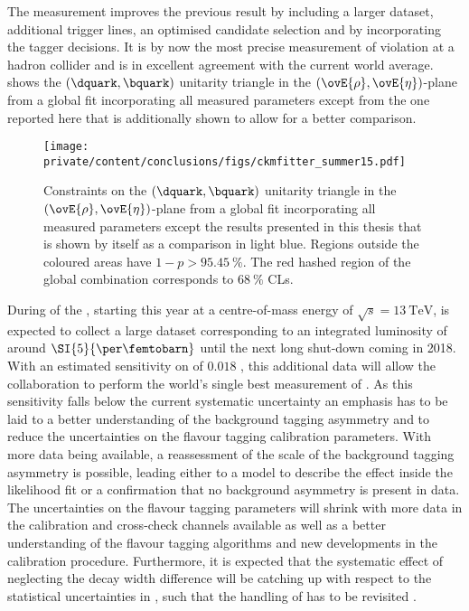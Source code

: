 The measurement improves the previous \LHCb result \cite{Aaij:1497268} by
including a larger dataset, additional trigger lines, an optimised candidate
selection and by incorporating the \SSpi tagger decisions. It is by now the most
precise measurement of \CP violation at a hadron collider and is in excellent
agreement with the current world average. 
shows the ${(\dquark,\bquark)}$ unitarity triangle in the
${(\ovE{\rho},\ovE{\eta})}$-plane from a global fit incorporating all measured
\CKM parameters \cite{Charles:2004jd} except from the one reported here that is
additionally shown to allow for a better comparison.
%
\begin{figure}[ht]
\centering
\texttt{[image: private/content/conclusions/figs/ckmfitter\_summer15.pdf]}
\caption{Constraints on the ${(\dquark,\bquark)}$ unitarity triangle in the
${(\ovE{\rho},\ovE{\eta})}$-plane from a global fit incorporating all measured
\CKM parameters except the results presented in this thesis that is shown by
itself as a comparison in light blue. Regions outside the coloured areas have
$1-p > \SI{95.45}{\percent}$. The red hashed region of the global combination
corresponds to $\SI{68}{\percent}$ \acp{CL}. \cite{Charles:2004jd}}
\label{fig:conclusion:ckm_fitter_15}
\end{figure}

During \RunTwo of the \LHC, starting this year at a centre-of-mass energy of
$\sqrt{s} = \SI{13}{\TeV}$, \LHCb is expected to collect a large dataset
corresponding to an integrated luminosity of around $\SI{5}{\per\femtobarn}$
until the next long shut-down coming in 2018. With an estimated sensitivity on
\SJpsiKS of $\num{0.018}$ \cite{Moedden:2015}, this additional data will allow
the \LHCb collaboration to perform the world's single best measurement of
\sintwobeta. As this sensitivity falls below the current systematic uncertainty
an emphasis has to be laid to a better understanding of the background tagging
asymmetry and to reduce the uncertainties on the flavour tagging calibration
parameters. With more data being available, a reassessment of the scale of the
background tagging asymmetry is possible, leading either to a model to describe
the effect inside the likelihood fit or a confirmation that no background
asymmetry is present in data. The uncertainties on the flavour tagging
parameters will shrink with more data in the calibration and cross-check
channels available as well as a better understanding of the flavour tagging
algorithms and new developments in the calibration procedure. Furthermore, it is
expected that the systematic effect of neglecting the decay width difference
\DGd will be catching up with respect to the statistical uncertainties in
\RunTwo, such that the handling of \DGd has to be revisited \cite{Moedden:2015}.

